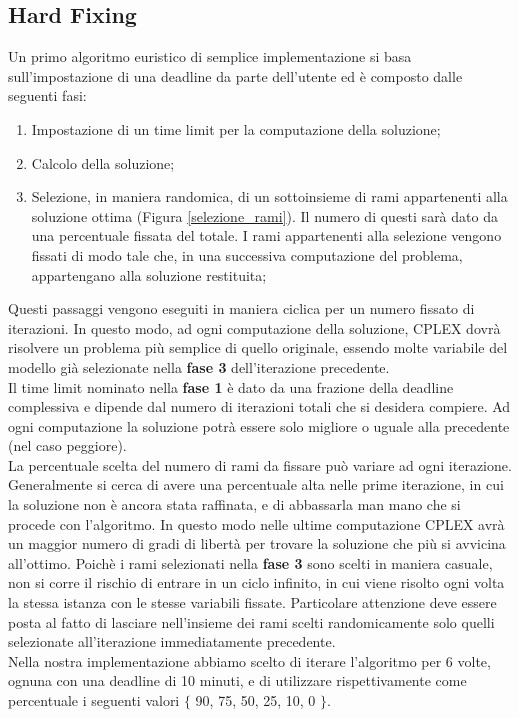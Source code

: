 \subsection{Hard Fixing}
Un primo algoritmo euristico di semplice implementazione si basa sull'impostazione di una deadline da parte dell'utente ed è composto dalle seguenti fasi:
\begin{enumerate}
\item{Impostazione di un time limit per la computazione della soluzione;}
\item{Calcolo della soluzione;}
\item{Selezione, in maniera randomica, di un sottoinsieme di rami appartenenti alla soluzione ottima (Figura \ref{selezione_rami}). 
Il numero di questi sarà dato da una percentuale fissata del totale. I rami appartenenti alla selezione vengono fissati di modo tale che, in una successiva computazione del problema, appartengano alla soluzione restituita;}
\end{enumerate} 
Questi passaggi vengono eseguiti in maniera ciclica per un numero fissato di iterazioni. In questo modo, ad ogni computazione della soluzione, CPLEX dovrà risolvere un problema più semplice di quello originale, essendo molte variabile del modello già selezionate nella \textbf{fase 3} dell'iterazione precedente.\\
Il time limit nominato nella \textbf{fase 1} è dato da una frazione della deadline complessiva e dipende dal numero di iterazioni totali che si desidera compiere. Ad ogni computazione la soluzione potrà essere solo migliore o uguale alla precedente (nel caso peggiore).\\
La percentuale scelta del numero di rami da fissare può variare ad ogni iterazione. Generalmente si cerca di avere una percentuale alta nelle prime iterazione, in cui la soluzione non è ancora stata raffinata, e di abbassarla man mano che si procede con l'algoritmo. In questo modo nelle ultime computazione CPLEX avrà un maggior numero di gradi di libertà per trovare la soluzione che più si avvicina all'ottimo. Poichè i rami selezionati nella \textbf{fase 3} sono scelti in maniera casuale, non si corre il rischio di entrare in un ciclo infinito, in cui viene risolto ogni volta la stessa istanza con le stesse variabili fissate. Particolare attenzione deve essere posta al fatto di lasciare nell'insieme dei rami scelti randomicamente solo quelli selezionate all'iterazione immediatamente precedente.\\
Nella nostra implementazione abbiamo scelto di iterare l'algoritmo per 6 volte, ognuna con una deadline di 10 minuti, e di utilizzare rispettivamente come percentuale i seguenti valori $\lbrace$ 90, 75, 50, 25, 10, 0 $\rbrace$.\\
